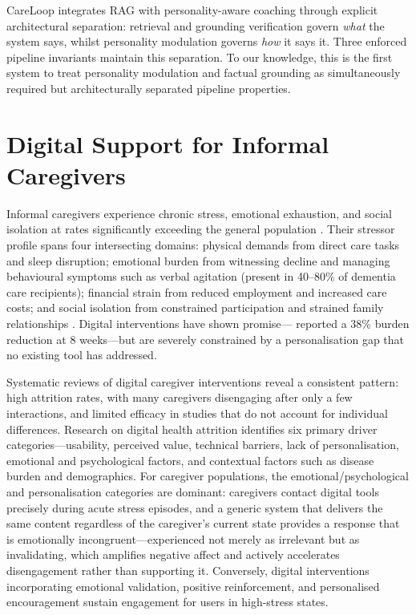 \documentclass[10pt,a4paper]{report}
\begin{document}
CareLoop integrates RAG with personality-aware coaching through explicit architectural separation: retrieval and grounding verification govern \emph{what} the system says, whilst personality modulation governs \emph{how} it says it. Three enforced pipeline invariants maintain this separation. To our knowledge, this is the first system to treat personality modulation and factual grounding as simultaneously required but architecturally separated pipeline properties.

\section{Digital Support for Informal Caregivers}

Informal caregivers experience chronic stress, emotional exhaustion, and social isolation at rates significantly exceeding the general population \citep{Schulz2008, Pinquart2003}. Their stressor profile spans four intersecting domains: physical demands from direct care tasks and sleep disruption; emotional burden from witnessing decline and managing behavioural symptoms such as verbal agitation (present in 40--80\% of dementia care recipients); financial strain from reduced employment and increased care costs; and social isolation from constrained participation and strained family relationships \citep{Brodaty2009}. Digital interventions have shown promise---\citet{Mooney2024} reported a 38\% burden reduction at 8 weeks---but are severely constrained by a personalisation gap that no existing tool has addressed.

Systematic reviews of digital caregiver interventions reveal a consistent pattern: high attrition rates, with many caregivers disengaging after only a few interactions, and limited efficacy in studies that do not account for individual differences. Research on digital health attrition identifies six primary driver categories---usability, perceived value, technical barriers, lack of personalisation, emotional and psychological factors, and contextual factors such as disease burden and demographics. For caregiver populations, the emotional/psychological and personalisation categories are dominant: caregivers contact digital tools precisely during acute stress episodes, and a generic system that delivers the same content regardless of the caregiver's current state provides a response that is emotionally incongruent---experienced not merely as irrelevant but as invalidating, which amplifies negative affect and actively accelerates disengagement rather than supporting it. Conversely, digital interventions incorporating emotional validation, positive reinforcement, and personalised encouragement sustain engagement for users in high-stress states.
\end{document}
